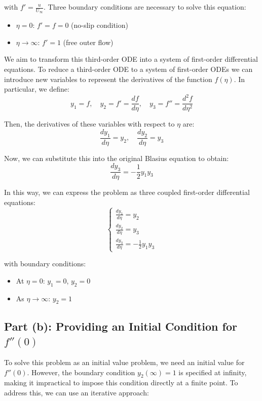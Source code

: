 \documentclass{article}
\begin{document}
with \( f' = \frac{u}{U_\infty} \). Three boundary conditions are necessary to solve this equation:
\begin{itemize}
    \item \( \eta = 0 \): \( f' = f = 0 \) (no-slip condition)
    \item \( \eta \to \infty \): \( f' = 1 \) (free outer flow)
\end{itemize}

We aim to transform this third-order ODE into a system of first-order differential equations. To reduce a third-order ODE to a 
system of first-order ODEs we can introduce new variables to represent the derivatives of the function \( f(\eta) \). 
In particular, we define:
\[
y_1 = f, \quad y_2 = f' = \frac{df}{d\eta}, \quad y_3 = f'' = \frac{d^2 f}{d\eta^2}
\]

Then, the derivatives of these variables with respect to \(\eta\) are:
\[
\frac{dy_1}{d\eta} = y_2, \quad \frac{dy_2}{d\eta} = y_3
\]

Now, we can substitute this into the original Blasius equation to obtain:
\[
\frac{dy_3}{d\eta} = -\frac{1}{2} y_1 y_3
\]

In this way, we can express the problem as three coupled first-order differential equations:
\[
\begin{cases}
\frac{dy_1}{d\eta} = y_2 \\
\frac{dy_2}{d\eta} = y_3 \\
\frac{dy_3}{d\eta} = -\frac{1}{2} y_1 y_3
\end{cases}
\]

with boundary conditions:
\begin{itemize}
    \item At \( \eta = 0 \): \( y_1 = 0 \), \( y_2 = 0 \)
    \item As \( \eta \to \infty \): \( y_2 = 1 \)
\end{itemize}

\subsection*{Part (b): Providing an Initial Condition for \( f''(0)\)}

To solve this problem as an initial value problem, we need an initial value for \( f''(0) \). However, the boundary condition \( y_2(\infty) = 1 \) is 
specified at infinity, making it impractical to impose this condition directly at a finite point. To address this, we can use an iterative approach:
\end{document}
